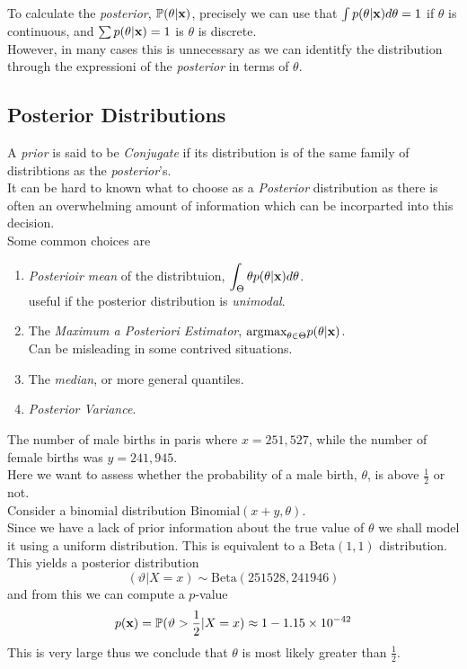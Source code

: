 \documentclass[11pt,a4paper]{article}
\begin{document}
To calculate the \textit{posterior}, $\mathbb{P}(\theta|\textbf{x})$, precisely we can use that $\int p(\theta|\textbf{x})d\theta=1$ if $\theta$ is continuous, and $\sum p(\theta|\textbf{x})=1$ is $\theta$ is discrete.\\
However, in many cases this is unnecessary as we can identitfy the distribution through the expressioni of the \textit{posterior} in terms of $\theta$.\\

\subsection{Posterior Distributions}

A \textit{prior} is said to be \textit{Conjugate} if its distribution is of the same family of distribtions as the \textit{posterior}'s.\\

It can be hard to known what to choose as a \textit{Posterior} distribution as there is often an overwhelming amount of information which can be incorparted into this decision.\\
Some common choices are
\begin{enumerate}[label=\roman*)]
	\item \textit{Posterioir mean} of the distribtuion, $\displaystyle\int_\Theta\theta p(\theta|\textbf{x})d\theta$.\\
	\nb useful if the posterior distribution is \textit{unimodal}.
	\item The \textit{Maximum a Posteriori Estimator}, $\text{argmax}_{\theta\in\Theta}p(\theta|\textbf{x})$.\\
	\nb Can be misleading in some contrived situations.
	\item The \textit{median}, or more general quantiles.
	\item \textit{Posterior Variance}.
\end{enumerate}

The number of male births in paris where $x=251,527$, while the number of female births was $y=241,945$.\\
Here we want to assess whether the probability of a male birth, $\theta$, is above $\frac{1}{2}$ or not.\\
Consider a binomial distribution $\text{Binomial}(x+y,\theta)$.\\
Since we have a lack of prior information about the true value of $\theta$ we shall model it using a uniform distribution. This is equivalent to a $\text{Beta}(1,1)$ distribution.\\
This yields a posterior distribution
$$(\vartheta|X=x)\sim\text{Beta}(251528,241946)$$
and from this we can compute a $p$-value
$$p(\textbf{x})=\mathbb{P}(\vartheta>\frac{1}{2}|X=x)\approx1-1.15\times 10^{-42}$$
This is very large thus we conclude that $\theta$ is most likely greater than $\frac{1}{2}$.\\
\end{document}
